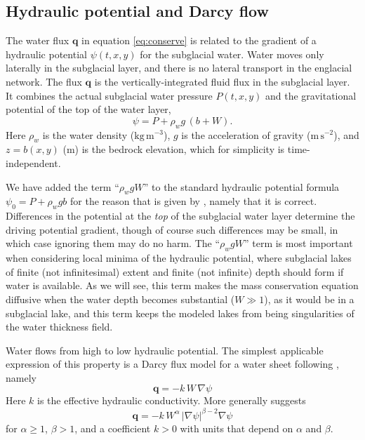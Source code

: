 \documentclass[11pt,final]{amsart}
\newcommand\bq{\mathbf{q}}
\newcommand{\grad}{\nabla}
\begin{document}
\subsection*{Hydraulic potential and Darcy flow}  The water flux $\bq$ in equation \eqref{eq:conserve} is related to the gradient of a hydraulic potential $\psi(t,x,y)$ for the subglacial water.  Water moves only laterally in the subglacial layer, and there is no lateral transport in the englacial network.  The flux $\bq$ is the vertically-integrated fluid flux in the subglacial layer.  It combines the actual subglacial water pressure $P(t,x,y)$ and the gravitational potential of the top of the water layer,
\begin{equation} \label{eq:potential}
\psi = P + \rho_w g\, (b+W).
\end{equation}
Here $\rho_w$ is the water density ($\text{kg}\,\text{m}^{-3}$), $g$ is the acceleration of gravity ($\text{m}\,\text{s}^{-2}$), and $z=b(x,y)$ ($\text{m}$) is the bedrock elevation, which for simplicity is time-independent.

We have added the term ``$\rho_w g W$'' to the standard hydraulic potential formula $\psi_0 = P + \rho_w g b$ \citep[for example]{Clarke05} for the reason that is given by \cite{Hewittetal2012}, namely that it is correct.  Differences in the potential at the \emph{top} of the subglacial water layer determine the driving potential gradient, though of course such differences may be small, in which case ignoring them may do no harm.  The  ``$\rho_w g W$'' term is most important when considering local minima of the hydraulic potential, where subglacial lakes of finite (not infinitesimal) extent and finite (not infinite) depth should form if water is available.  As we will see, this term makes the mass conservation equation diffusive when the water depth becomes substantial ($W\gg 1$), as it would be in a subglacial lake, and this term keeps the modeled lakes from being singularities of the water thickness field.

Water flows from high to low hydraulic potential.  The simplest applicable expression of this property is a Darcy flux model for a water sheet following \cite{Clarke05}, namely
\begin{equation}  \label{eq:fluxearly}
\bq = - k \,W\, \grad \psi
\end{equation}
Here $k$ is the effective hydraulic conductivity.  More generally \cite{Schoofetal2012} suggests
\begin{equation}  \label{eq:flux}
\bq = - k\, W^\alpha\, |\grad \psi|^{\beta-2} \grad \psi
\end{equation}
for $\alpha \ge 1$, $\beta>1$, and a coefficient $k>0$ with units that depend on $\alpha$ and $\beta$.
\end{document}
